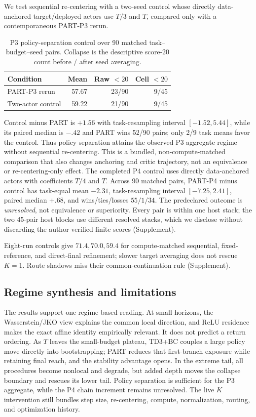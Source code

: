 \documentclass[twoside]{article}
\begin{document}
We test sequential re-centering with a two-seed control whose directly
data-anchored target/deployed actors use $T/3$ and $T$, compared only with a
contemporaneous PART-P3 rerun.
\begin{table}[t]
\caption{P3 policy-separation control over 90 matched task--budget--seed pairs.
Collapse is the descriptive score-20 count before / after seed averaging.}
\centering
\small
\setlength{\tabcolsep}{2.5pt}
\begin{tabular}{lrrr}
\toprule
Condition & Mean & Raw $<20$ & Cell $<20$\\
\midrule
PART-P3 rerun &57.67&23/90&9/45\\
Two-actor control &59.22&21/90&9/45\\
\bottomrule
\end{tabular}
\label{tab:policy_separation}
\end{table}
Control minus PART is $+1.56$ with task-resampling interval $[-1.52,5.44]$,
while its paired median is $-.42$ and PART wins 52/90 pairs; only 2/9 task
means favor the control. Thus policy separation attains the observed P3
aggregate regime without sequential re-centering. This is a bundled,
non-compute-matched comparison that also changes anchoring and critic
trajectory, not an equivalence or re-centering-only effect. The completed P4
control uses directly data-anchored actors with coefficients $T/4$ and $T$.
Across 90 matched pairs, PART-P4 minus control has task-equal mean $-2.31$,
task-resampling interval $[-7.25,2.41]$, paired median $+.68$, and
wins/ties/losses $55/1/34$. The predeclared outcome is \emph{unresolved},
not equivalence or superiority. Every pair is within one host stack; the two
45-pair host blocks use different resolved stacks, which we disclose without
discarding the author-verified finite scores (Supplement).

Eight-run controls give $71.4,70.0,59.4$ for compute-matched sequential,
fixed-reference, and direct-final refinement; slower target averaging does not
rescue $K=1$. Route shadows miss their common-continuation rule (Supplement).

\subsection{Regime synthesis and limitations}

The results support one regime-based reading. At small horizons, the
Wasserstein/JKO view explains the common local direction, and ReLU residence
makes the exact affine identity empirically relevant. It does not predict a
return ordering. As $T$ leaves the small-budget plateau, TD3+BC couples a large
policy move directly into bootstrapping; PART reduces that first-branch exposure
while retaining final reach, and the stability advantage opens. In the extreme
tail, all procedures become nonlocal and degrade, but added depth moves the
collapse boundary and rescues its lower tail. Policy separation is sufficient
for the P3 aggregate, while the P4 chain increment remains unresolved. The live
$K$ intervention still bundles step size, re-centering, compute, normalization,
routing, and optimization history.
\end{document}
